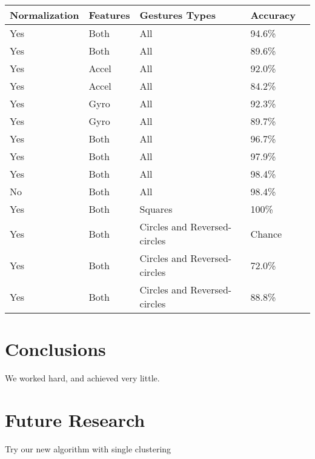 \documentclass[12pt]{article}
\begin{document}
\begin{center}
\begin{tabular}{ | l | l | l | l | l | }
  \hline
  Normalization & Features & Gestures Types & Accuracy \\ \hline
  Yes	&	Both  &	All &	94.6\% \\ \hline
  Yes	&	Both	&	All &	89.6\% \\ \hline
  Yes	&	Accel &	All &	92.0\% \\ \hline
  Yes	&	Accel &	All &	84.2\% \\ \hline
  Yes	&	Gyro  &	All &	92.3\% \\ \hline
  Yes	&	Gyro  &	All &	89.7\% \\ \hline
  Yes	&	Both	&	All &	96.7\% \\ \hline
  Yes	&	Both	&	All &	97.9\% \\ \hline
  Yes	&	Both  &	All &	98.4\% \\ \hline
  No	&	Both	&	All &	98.4\% \\ \hline
  Yes	&	Both	& Squares &	100\% \\ \hline
  Yes	&	Both	& Circles and Reversed-circles  &	Chance \\ \hline
  Yes	&	Both	& Circles and Reversed-circles  &	72.0\% \\ \hline
  Yes	&	Both  & Circles and Reversed-circles  &	88.8\% \\
  \hline
\end{tabular}
\end{center}

\section{Conclusions}\label{conclusions}
We worked hard, and achieved very little.

\section{Future Research}
Try our new algorithm with single clustering



\end{document}
